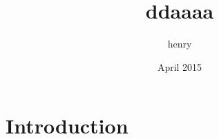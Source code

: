 \documentclass{article}
\title{ddaaaa}
\author{henry }
\date{April 2015}
\begin{document}
\maketitle

\section{Introduction}
\end{document}
